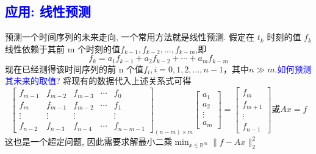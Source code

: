 \documentclass[12pt,a4paper]{article}
\begin{document}
\subsection{\textcolor{blue}{应用: 线性预测}}
预测一个时间序列的未来走向, 一个常用方法就是线性预测. 假定在 $t_{k}$ 时刻的值 $f_{k}$ 线性依赖于其前 m 个时刻的值$f_{k-1}, f_{k-2}, \dots, f_{k-m}$,即
\begin{equation}
f_{k}=a_{1} f_{k-1}+a_{2} f_{k-2}+\cdots+a_{m} f_{k-m}
\end{equation}
现在已经测得该时间序列的前 n 个值$f_{i}, i=0,1,2, \ldots, n-1$，其中$n \gg m$.\textcolor{blue}{如何预测其未来的取值?}
将现有的数据代入上述关系式可得
$$
\left[\begin{array}{ccccc}
{f_{m-1}} & {f_{m-2}} & {f_{m-3}} & {\cdots} & {f_{0}} \\
 {f_{m}} & {f_{m-1}} & {f_{m-2}} & {\cdots} & {f_{1}} \\ 
 {\vdots} & {\vdots} & {\vdots} & {} & {\vdots} \\ 
 {f_{n-2}} & {f_{n-3}} & {f_{n-4}} & {\cdots} & {f_{n-m-1}}
 \end{array}\right]_{(n-m) \times m}\left[\begin{array}{c}
 {a_{1}} \\
  {a_{2}} \\
  {\vdots} \\ 
  {a_{m}}
  \end{array}\right]=\left[\begin{array}{c}
  {f_{m}} \\ 
  {f_{m+1}} \\ 
  {\vdots} \\ 
  {f_{n-1}}
  \end{array}\right]或A x=f
$$
这也是一个超定问题, 因此需要求解最小二乘$\min _{x \in \mathbb{R}^{m}}\|f-A x\|_{2}^{2}$
\end{document}
